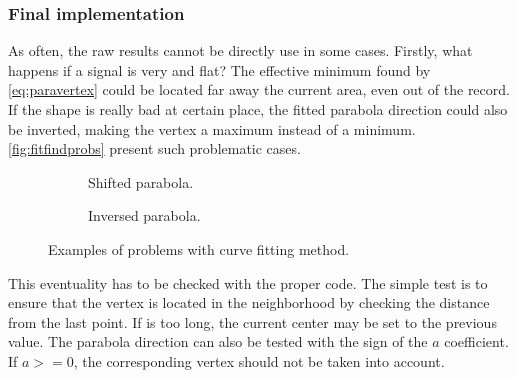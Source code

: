 \subsubsection{Final implementation}

As often, the raw results cannot be directly use in some cases. Firstly, what happens if a signal is very and flat? The effective minimum found by \eqref{eq:paravertex} could be located far away the current area, even out of the record. If the shape is really bad at certain place, the fitted parabola direction could also be inverted, making the vertex a maximum instead of a minimum. \autoref{fig:fitfindprobs} present such problematic cases.

\begin{figure}[!ht]
\centering
    \begin{subfigure}[t]{0.45\textwidth}
    \centering
    \caption{Shifted parabola.}
    \label{fig:fitfinddist}
    \end{subfigure}
    \begin{subfigure}[t]{0.45\textwidth}
    \centering
    \caption{Inversed parabola.}
    \label{fig:fitfindmax}
    \end{subfigure}
    \caption{Examples of problems with curve fitting method.}
    \label{fig:fitfindprobs}
\end{figure}

This eventuality has to be checked with the proper code. The simple test is to ensure that the vertex is located in the neighborhood by checking the distance from the last point. If is too long, the current center may be set to the previous value. The parabola direction can also be tested with the sign of the $a$ coefficient. If $a >= 0$, the corresponding vertex should not be taken into account.

